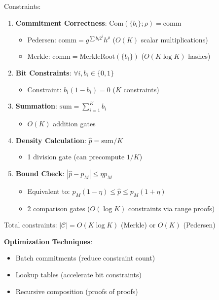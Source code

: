 \documentclass[12pt]{article}
\theoremstyle{plain}
\theoremstyle{definition}
\begin{document}
Constraints:
\begin{enumerate}
\item \textbf{Commitment Correctness}: $\text{Com}(\{b_i\}; \rho) = \text{comm}$
\begin{itemize}
   \item Pedersen: $\text{comm} = g^{\sum b_i 2^i} h^{\rho}$ ($O(K)$ scalar multiplications)
   \item Merkle: $\text{comm} = \text{MerkleRoot}(\{b_i\})$ ($O(K \log K)$ hashes)
\end{itemize}

\item \textbf{Bit Constraints}: $\forall i, b_i \in \{0,1\}$
\begin{itemize}
   \item Constraint: $b_i(1-b_i) = 0$ ($K$ constraints)
\end{itemize}

\item \textbf{Summation}: $\text{sum} = \sum_{i=1}^K b_i$
\begin{itemize}
   \item $O(K)$ addition gates
\end{itemize}

\item \textbf{Density Calculation}: $\hat{p} = \text{sum}/K$
\begin{itemize}
   \item 1 division gate (can precompute $1/K$)
\end{itemize}

\item \textbf{Bound Check}: $|\hat{p} - p_M| \le \eta p_M$
\begin{itemize}
   \item Equivalent to: $p_M(1-\eta) \le \hat{p} \le p_M(1+\eta)$
   \item 2 comparison gates ($O(\log K)$ constraints via range proofs)
\end{itemize}
\end{enumerate}

Total constraints: $|\mathcal{C}| = O(K \log K)$ (Merkle) or $O(K)$ (Pedersen)

\textbf{Optimization Techniques}:
\begin{itemize}
\item Batch commitments (reduce constraint count)
\item Lookup tables (accelerate bit constraints)
\item Recursive composition (proofs of proofs)
\end{itemize}
\end{document}
